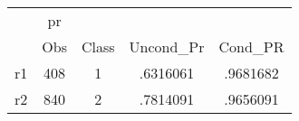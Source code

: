 \begin{tabular}{l*{4}{c}}
\hline\hline
            &          pr&            &            &            \\
            &         Obs&       Class&   Uncond\_Pr&     Cond\_PR\\
\hline
r1          &         408&           1&    .6316061&    .9681682\\
r2          &         840&           2&    .7814091&    .9656091\\
\hline\hline
\end{tabular}
